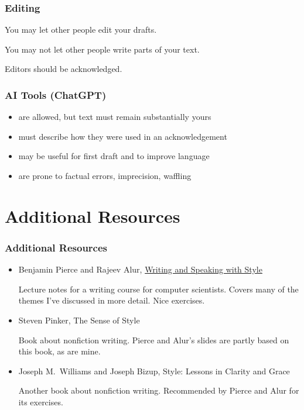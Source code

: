 \documentclass[xetex]{beamer}
\begin{document}
\begin{frame}
  \frametitle{Editing}

  You may let other people edit your drafts.

  \medskip

  You may not let other people write parts of your text.

  \medskip

  Editors should be acknowledged.
\end{frame}

\begin{frame}
  \frametitle{AI Tools (ChatGPT)}

  \begin{itemize}
    \item are allowed, but text must remain substantially yours
    \item must describe how they were used in an acknowledgement
    \item may be useful for first draft and to improve language
    \item are prone to factual errors, imprecision, waffling
  \end{itemize}
\end{frame}

\section{Additional Resources}

\begin{frame}
  \frametitle{Additional Resources}

  \begin{itemize}
    \item Benjamin Pierce and Rajeev Alur, \href{https://docs.google.com/document/d/1_vBXbugoLjO171w3wovs3ugmRQI-O6EcSVFDBF7eUzE/edit}{Writing and Speaking with Style}

          Lecture notes for a writing course for computer scientists.
          Covers many of the themes I've discussed in more detail.
          Nice exercises.
    \item Steven Pinker, The Sense of Style

          Book about nonfiction writing.
          Pierce and Alur's slides are partly based on this book, as are mine.

    \item Joseph M.\ Williams and Joseph Bizup, Style: Lessons in Clarity and Grace

          Another book about nonfiction writing.
          Recommended by Pierce and Alur for its exercises.
  \end{itemize}
\end{frame}
\end{document}
